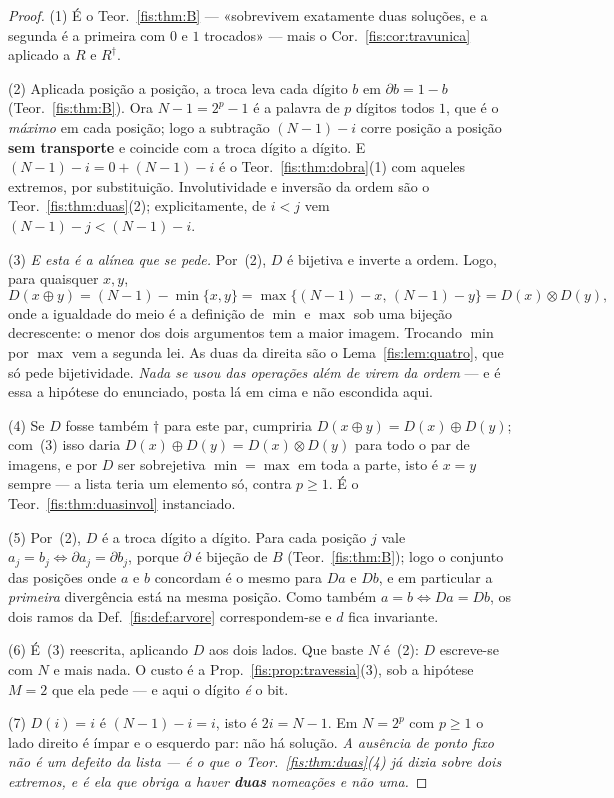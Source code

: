 \documentclass[livro.tex]{subfiles}
\begin{document}
\begin{proof}
(1) É o Teor.~\ref{fis:thm:B} --- «sobrevivem exatamente duas soluções, e a
segunda é a primeira com $0$ e $1$ trocados» --- mais o
Cor.~\ref{fis:cor:travunica} aplicado a $R$ e $R^{\dagger}$.

(2) Aplicada posição a posição, a troca leva cada dígito $b$ em $\partial b=1-b$
(Teor.~\ref{fis:thm:B}). Ora $N-1=2^{p}-1$ é a palavra de $p$ dígitos todos $1$,
que é o \emph{máximo} em cada posição; logo a subtração $(N-1)-i$ corre posição a
posição \textbf{sem transporte} e coincide com a troca dígito a dígito. E
$(N-1)-i=0+(N-1)-i$ é o Teor.~\ref{fis:thm:dobra}(1) com aqueles extremos, por
substituição. Involutividade e inversão da ordem são o
Teor.~\ref{fis:thm:duas}(2); explicitamente, de $i<j$ vem $(N-1)-j<(N-1)-i$.

(3) \emph{E esta é a alínea que se pede.} Por~(2), $D$ é bijetiva e inverte a
ordem. Logo, para quaisquer $x,y$,
\[
D(x\oplus y)=(N-1)-\min\{x,y\}=\max\{(N-1)-x,\,(N-1)-y\}=D(x)\otimes D(y) ,
\]
onde a igualdade do meio é a definição de $\min$ e $\max$ sob uma bijeção
decrescente: o menor dos dois argumentos tem a maior imagem. Trocando $\min$ por
$\max$ vem a segunda lei. As duas da direita são o Lema~\ref{fis:lem:quatro}, que
só pede bijetividade. \emph{Nada se usou das operações além de virem da ordem} ---
e é essa a hipótese do enunciado, posta lá em cima e não escondida aqui.

(4) Se $D$ fosse também $\dagger$ para este par, cumpriria
$D(x\oplus y)=D(x)\oplus D(y)$; com~(3) isso daria
$D(x)\oplus D(y)=D(x)\otimes D(y)$ para todo o par de imagens, e por $D$ ser
sobrejetiva $\min=\max$ em toda a parte, isto é $x=y$ sempre --- a lista teria um
elemento só, contra $p\ge1$. É o Teor.~\ref{fis:thm:duasinvol} instanciado.

(5) Por~(2), $D$ é a troca dígito a dígito. Para cada posição $j$ vale
$a_j=b_j\iff\partial a_j=\partial b_j$, porque $\partial$ é bijeção de $B$
(Teor.~\ref{fis:thm:B}); logo o conjunto das posições onde $a$ e $b$ concordam é
o mesmo para $Da$ e $Db$, e em particular a \emph{primeira} divergência está na
mesma posição. Como também $a=b\iff Da=Db$, os dois ramos da
Def.~\ref{fis:def:arvore} correspondem-se e $d$ fica invariante.

(6) É~(3) reescrita, aplicando $D$ aos dois lados. Que baste $N$ é~(2): $D$
escreve-se com $N$ e mais nada. O custo é a Prop.~\ref{fis:prop:travessia}(3),
sob a hipótese $M=2$ que ela pede --- e aqui o dígito \emph{é} o bit.

(7) $D(i)=i$ é $(N-1)-i=i$, isto é $2i=N-1$. Em $N=2^{p}$ com $p\ge1$ o lado
direito é ímpar e o esquerdo par: não há solução. \emph{A ausência de ponto fixo
não é um defeito da lista --- é o que o Teor.~\ref{fis:thm:duas}(4) já dizia sobre
dois extremos, e é ela que obriga a haver \textbf{duas} nomeações e não uma.}
\end{proof}
\end{document}
